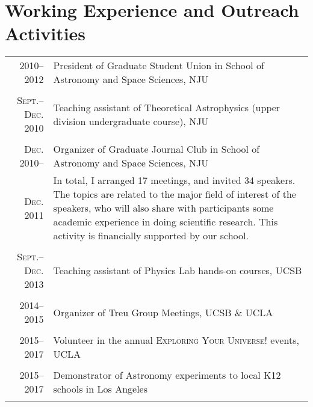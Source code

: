 \documentclass[letterpaper,10pt]{article}
\begin{document}
\section{Working Experience and Outreach Activities}
\begin{tabular}{rp{5.5in}}

\textsc{2010--2012}  & President of Graduate Student Union in School of Astronomy and Space Sciences, NJU \\
\multicolumn{2}{c}{} \\

\textsc{\small Sept.--Dec. 2010}  & Teaching assistant of Theoretical Astrophysics (upper division undergraduate course), NJU \\
\multicolumn{2}{c}{} \\

\textsc{Dec. 2010}--  & Organizer of Graduate Journal Club in School of Astronomy 
and Space Sciences, NJU \\
\textsc{Dec. 2011}    & \small{In total, I arranged 17 meetings, and invited 
34 speakers.
The topics are related to the major field of interest of the speakers, who will also share with participants some academic experience in doing scientific research. This activity is financially supported by our school.}  \\
\multicolumn{2}{c}{} \\

\textsc{\small Sept.--Dec. 2013}  & Teaching assistant of Physics Lab hands-on courses, UCSB   \\
\multicolumn{2}{c}{} \\
\textsc{2014--2015}  & Organizer of Treu Group Meetings, UCSB \& UCLA \\
\multicolumn{2}{c}{} \\
\textsc{2015--2017}  & Volunteer in the annual \textsc{Exploring Your Universe!} events, UCLA \\
\multicolumn{2}{c}{} \\
\textsc{2015--2017}  & Demonstrator of Astronomy experiments to local K12 schools in Los Angeles \\
\multicolumn{2}{c}{} \\


\end{tabular}
\end{document}
